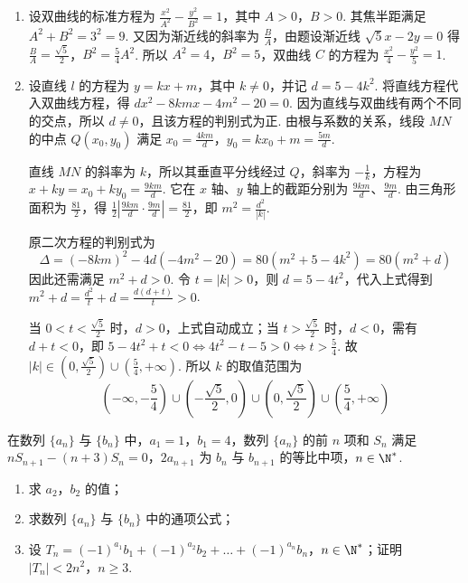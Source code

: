 \begin{solution}
\begin{enumerate}
\item
设双曲线的标准方程为 \(\frac{x^2}{A^2}-\frac{y^2}{B^2}=1\)，其中 \(A>0\)，\(B>0\). 其焦半距满足 \(A^2+B^2=3^2=9\). 又因为渐近线的斜率为 \(\frac{B}{A}\)，由题设渐近线 \(\sqrt{5}x-2y=0\) 得
\(\frac{B}{A}=\frac{\sqrt{5}}2\)，\(B^2=\frac54A^2\). 所以 \(A^2=4\)，\(B^2=5\)，双曲线 \(C\) 的方程为 \(\frac{x^2}{4}-\frac{y^2}{5}=1\).

\item
设直线 \(l\) 的方程为 \(y=kx+m\)，其中 \(k\neq0\)，并记 \(d=5-4k^2\). 将直线方程代入双曲线方程，得
\(d x^2-8kmx-4m^2-20=0\).
因为直线与双曲线有两个不同的交点，所以 \(d\neq0\)，且该方程的判别式为正. 由根与系数的关系，线段 \(MN\) 的中点 \(Q(x_0,y_0)\) 满足
\(x_0=\frac{4km}{d}\)，\(y_0=kx_0+m=\frac{5m}{d}\).

直线 \(MN\) 的斜率为 \(k\)，所以其垂直平分线经过 \(Q\)，斜率为 \(-\frac1k\)，方程为 \(x+ky=x_0+ky_0=\frac{9km}{d}\).
它在 \(x\) 轴、\(y\) 轴上的截距分别为 \(\frac{9km}{d}\)、\(\frac{9m}{d}\). 由三角形面积为 \(\frac{81}{2}\)，得
\(\frac12\left|\frac{9km}{d}\cdot\frac{9m}{d}\right|=\frac{81}{2}\)，即 \(m^2=\frac{d^2}{|k|}\).

原二次方程的判别式为
\[
\Delta=(-8km)^2-4d(-4m^2-20)=80\left(m^2+5-4k^2\right)=80\left(m^2+d\right)
\]
因此还需满足 \(m^2+d>0\). 令 \(t=|k|>0\)，则 \(d=5-4t^2\)，代入上式得到
\(m^2+d=\frac{d^2}{t}+d=\frac{d(d+t)}{t}>0\).

当 \(0<t<\frac{\sqrt{5}}2\) 时，\(d>0\)，上式自动成立；当 \(t>\frac{\sqrt{5}}2\) 时，\(d<0\)，需有 \(d+t<0\)，即
\(5-4t^2+t<0\iff 4t^2-t-5>0\iff t>\frac54\).
故
\(|k|\in\left(0,\frac{\sqrt{5}}2\right)\cup\left(\frac54,+\infty\right)\).
所以 \(k\) 的取值范围为
\[
\left(-\infty,-\frac54\right)\cup\left(-\frac{\sqrt{5}}2,0\right)\cup\left(0,\frac{\sqrt{5}}2\right)\cup\left(\frac54,+\infty\right)
\]
\end{enumerate}
\end{solution}

\begin{problem}
在数列 \(\{a_{n}\}\) 与 \(\{b_{n}\}\) 中，\(a_{1} = 1\)，\(b_{1} = 4\)，数列 \(\{a_{n}\}\) 的前 \(n\) 项和 \(S_{n}\) 满足 \(nS_{n + 1} - (n + 3)S_{n} = 0\)，\(2a_{n + 1}\) 为 \(b_{n}\) 与 \(b_{n + 1}\) 的等比中项，\(n \in \N^{*}\).
\begin{enumerate}
\item 求 \(a_{2}\)，\(b_{2}\) 的值；
\item 求数列 \(\{a_{n}\}\) 与 \(\{b_{n}\}\) 中的通项公式；
\item 设 \(T_{n} = (-1)^{a_{1}}b_{1} + (-1)^{a_{2}}b_{2} + \dots + (-1)^{a_{n}}b_{n}\)，\(n \in \N^{*}\)；证明 \(|T_{n}| < 2n^{2}\)，\(n \geqslant 3\).
\end{enumerate}
\end{problem}

